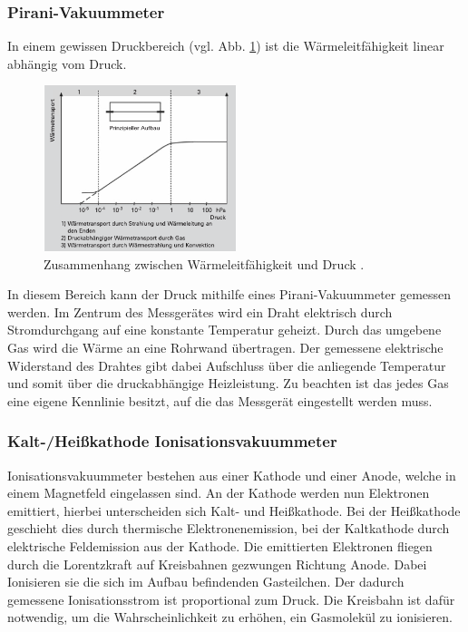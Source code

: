 \subsubsection{Pirani-Vakuummeter}
In einem gewissen Druckbereich (vgl. Abb. \ref{fig:wärme}) ist die Wärmeleitfähigkeit linear abhängig vom Druck.
\begin{figure}[h]
    \centering
    \includegraphics[width=0.5\textwidth]{abb/waerme.png}
    \caption{Zusammenhang zwischen Wärmeleitfähigkeit und Druck \cite{Pfeifer}.}
    \label{fig:wärme}
\end{figure}
In diesem Bereich kann der Druck mithilfe eines Pirani-Vakuummeter gemessen werden.
Im Zentrum des Messgerätes wird ein Draht elektrisch durch Stromdurchgang auf eine konstante Temperatur geheizt.
Durch das umgebene Gas wird die Wärme an eine Rohrwand übertragen. 
Der gemessene elektrische Widerstand des Drahtes gibt dabei Aufschluss über die anliegende Temperatur und somit über die druckabhängige Heizleistung.
Zu beachten ist das jedes Gas eine eigene Kennlinie besitzt,
auf die das Messgerät eingestellt werden muss.

\subsubsection{Kalt-/Heißkathode Ionisationsvakuummeter}
Ionisationsvakuummeter bestehen aus einer Kathode und einer Anode,
welche in einem Magnetfeld eingelassen sind.
An der Kathode werden nun Elektronen emittiert,
hierbei unterscheiden sich Kalt- und Heißkathode.
Bei der Heißkathode geschieht dies durch thermische Elektronenemission,
bei der Kaltkathode durch elektrische Feldemission aus der Kathode.
Die emittierten Elektronen fliegen
durch die Lorentzkraft auf Kreisbahnen gezwungen
Richtung Anode.
Dabei Ionisieren sie die sich im Aufbau befindenden Gasteilchen.
Der dadurch gemessene Ionisationsstrom ist proportional zum Druck.
Die Kreisbahn ist dafür notwendig,
um die Wahrscheinlichkeit zu erhöhen, ein Gasmolekül zu ionisieren. 
